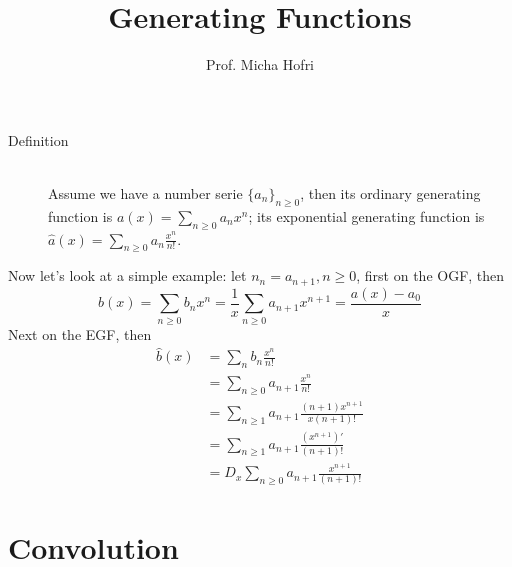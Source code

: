 \documentclass{article}
\author{Prof. Micha Hofri}
\title{Generating Functions}
\begin{document}
\maketitle
\begin{description}
\item[Definition] \hfill \\
Assume we have a number serie \(\{a_n\}_{n\geq 0}\), then its ordinary
generating function is \(a(x)=\sum_{n\geq 0}a_nx^n\); its exponential
generating function is \(\hat{a}(x)=\sum_{n\geq 0}a_n\frac{x^n}{n!}\).
\end{description}
Now let's look at a simple example: let \(n_n=a_{n+1}, n\geq 0\),
first on the OGF, then \\
\[
b(x)=\sum_{n\geq 0}b_nx^n=\frac{1}{x}\sum_{n\geq 0}a_{n+1}x^{n+1} =\frac{a(x)-a_0}{x}
\]
Next on the EGF, then\\
\begin{align*}
\hat{b}(x)&=\sum_nb_n\frac{x^n}{n!} \\
&=\sum_{n\geq 0}a_{n+1}\frac{x^n}{n!} \\
&=\sum_{n\geq 1}a_{n+1}\frac{(n+1)x^{n+1}}{x(n+1)!} \\
&=\sum_{n\geq 1}a_{n+1}\frac{(x^{n+1})'}{(n+1)!} \\
&=D_x\sum_{n\geq 0}a_{n+1}\frac{x^{n+1}}{(n+1)!}
\end{align*}
\section*{Convolution}
\end{document}
